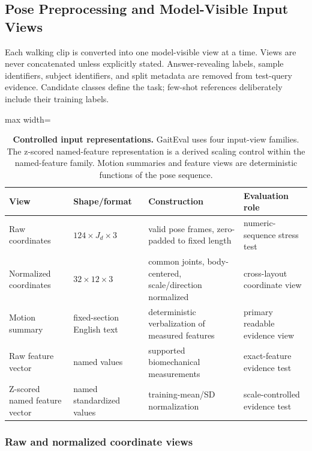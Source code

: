 \subsection{Pose Preprocessing and Model-Visible Input Views}
\label{sec:supp_inputs}

Each walking clip is converted into one model-visible view at a time. Views are never concatenated unless explicitly stated. Answer-revealing labels, sample identifiers, subject identifiers, and split metadata are removed from test-query evidence. Candidate classes define the task; few-shot references deliberately include their training labels.

\begin{table}[H]
\centering
\caption{\textbf{Controlled input representations.}
GaitEval uses four input-view families. The z-scored named-feature
representation is a derived scaling control within the named-feature
family. Motion summaries and feature
views are deterministic functions of the pose sequence.}
\label{tab:input_views}
\small
\begin{adjustbox}{max width=\textwidth}
\begin{tabular}{llll}
\toprule
View & Shape/format & Construction & Evaluation role \\
\midrule
Raw coordinates & $124\times J_d\times3$ & valid pose frames, zero-padded to fixed length & numeric-sequence stress test \\
Normalized coordinates & $32\times12\times3$ & common joints, body-centered, scale/direction normalized & cross-layout coordinate view \\
Motion summary & fixed-section English text & deterministic verbalization of measured features & primary readable evidence view \\
Raw feature vector & named values & supported biomechanical measurements & exact-feature evidence test \\
Z-scored named feature vector & named standardized values & training-mean/SD normalization & scale-controlled evidence test \\
\bottomrule
\end{tabular}
\end{adjustbox}
\end{table}

\subsubsection{Raw and normalized coordinate views}

